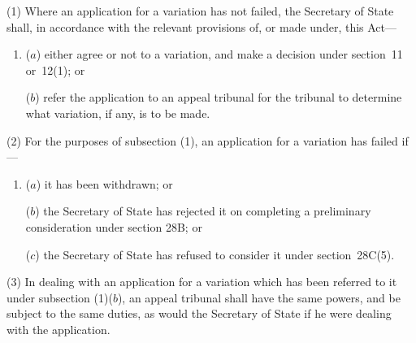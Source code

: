 \documentclass[12pt,a4paper]{article}
\begin{document}
%

(1) Where an application for a variation has not failed, the Secretary of State shall, in accordance with the relevant provisions of, or made under, this Act—
\begin{enumerate}\item[]
($a$) either agree or not to a variation, and make a decision under section~11 or~12(1); or

($b$) refer the application to an appeal tribunal for the tribunal to determine what variation, if any, is to be made.
\end{enumerate}

(2) For the purposes of subsection (1), 
an application for a variation  %
has failed if—
\begin{enumerate}\item[]
($a$) it has 
been withdrawn; or

($b$) the Secretary of State has rejected it on completing a preliminary consideration under section 28B;
or  %

($c$) the Secretary of State has refused to consider it under section~28C(5).
\end{enumerate}

(3) In dealing with 
an application for a variation  %
which has been referred to it under subsection (1)($b$), 
an appeal tribunal  %
shall have the same powers, and be subject to the same duties, as would the Secretary of State if he were dealing with the application.

\end{document}
